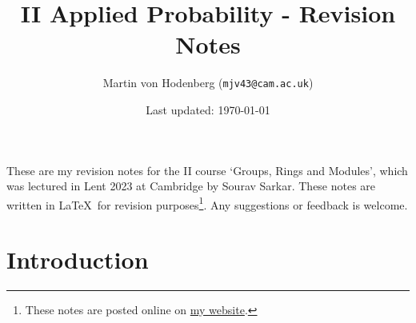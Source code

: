 \documentclass[egregdoesnotlikesansseriftitles,a4paper]{scrartcl}
\title{II Applied Probability - Revision Notes}
\author{Martin von Hodenberg (\texttt{mjv43@cam.ac.uk})}
\date{Last updated: \today}
\begin{document}
\maketitle
These are my revision notes for the II course `Groups, Rings and Modules', which was lectured in Lent 2023 at Cambridge by Sourav Sarkar. These notes are written in \LaTeX  \ for revision purposes\footnote{These notes are posted online on \href{https://mjv43.user.srcf.net/}{my website}.}. Any suggestions or feedback is welcome.

\newpage
\tableofcontents
\newpage
\section{Introduction}
\end{document}
